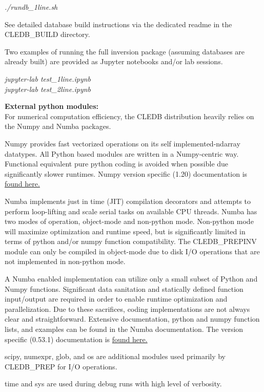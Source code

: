 \documentclass{article}
\begin{document}
\emph{\color{red}./rundb\_1line.sh} 

See detailed database build instructions via the dedicated readme in the CLEDB\_BUILD directory.

Two examples of running the full inversion package (assuming databases are already built) are provided as Jupyter notebooks and/or lab sessions.

\emph{\color{red}jupyter-lab test\_1line.ipynb}\\
\emph{\color{red}jupyter-lab test\_2line.ipynb}

\textbf{\large External python modules:\\}
For numerical computation efficiency, the CLEDB distribution heavily relies on the Numpy and Numba packages. 
\begin{description} [font=\normalfont,leftmargin=0.6in,style=multiline]
	\item[Numpy]
Numpy provides fast vectorized operations on its self implemented-ndarray datatypes. All Python based modules are written in a Numpy-centric way. Functional equivalent pure python coding is avoided when possible due significantly slower runtimes. Numpy version specific (1.20) documentation is \href{https://numpy.org/doc/1.20/}{found here.}
	\item[Numba]
Numba implements just in time (JIT) compilation decorators and attempts to perform loop-lifting and scale serial tasks on available CPU threads. Numba has two modes of operation, object-mode and non-python mode. Non-python mode will maximize optimization and runtime speed, but is significantly limited in terms of python and/or  numpy function compatibility. The CLEDB\_PREPINV module can only be compiled in object-mode due to disk I/O operations that are not implemented in non-python mode.

A Numba enabled implementation can utilize only a small subset of Python and Numpy functions. Significant data sanitation and statically defined function input/output are required in order to enable runtime optimization and parallelization. Due to these sacrifices, coding implementations are not always clear and straightforward. Extensive documentation, python and numpy function lists, and examples can be found in the Numba documentation. The version specific (0.53.1) documentation is \href{https://numba.readthedocs.io/en/0.53.1/}{found here.}
	\item[Others]
scipy, numexpr, glob, and os are additional modules used primarily by CLEDB\_PREP for I/O operations.
	\item[]
time and sys are used during debug runs with high level of verbosity.
\end{description}
\end{document}
